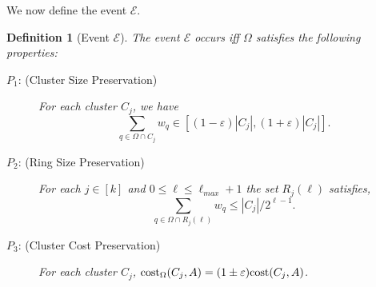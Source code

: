 \documentclass[11pt]{article}
\newtheorem{definition}[lemma]{Definition}
\theoremstyle{restate}
\theoremstyle{definition}
\newcommand{\eps}{\ensuremath{\varepsilon}}
\newcommand{\cost}{\textnormal{cost}}
\newcommand{\costom}{\cost_\Omega} %
\begin{document}
We now define the event $\mathcal{E}$.
\begin{definition}[Event $\mathcal E$]
	The event $\mathcal E$ occurs iff $\Omega$ satisfies the following properties:
	\begin{description}
		\item[$P_1$: (Cluster Size Preservation)] 
  For each cluster $C_j$, we have \[\sum_{q\in \Omega \cap C_j}w_q \in  [(1- \eps)|C_j|,(1+\eps)|C_j|].\]
	\item[$P_2$: (Ring Size Preservation)] 
 For each $j \in [k]$ and $0 \leq \ell \leq \ell_{max}+1$ the set $R_j(\ell)$ satisfies, \[\sum_{q\in \Omega \cap R_j(\ell)}w_q \leq |C_j|/2^{\ell-1}.\]
        \item[$P_3$: (Cluster Cost Preservation)] For each cluster $C_j$, $\costom(C_j, A) = (1 \pm \eps) \cost(C_j, A)$.
	\end{description}
\end{definition}
\end{document}
